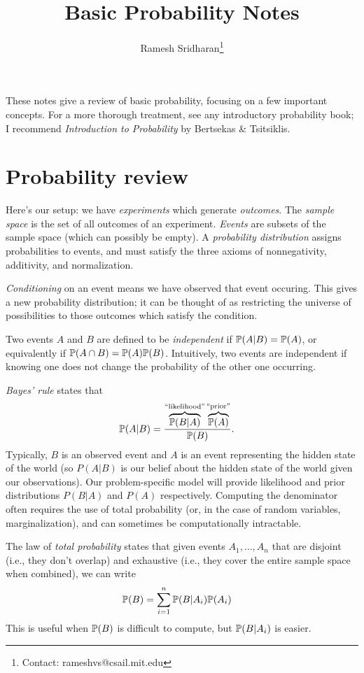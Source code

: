 \documentclass[12pt]{article}
\title{Basic Probability Notes}
\author{Ramesh Sridharan\thanks{Contact: \mbox{rameshvs@csail.mit.edu}}}
\date{}
\begin{document}
    \maketitle
    These notes give a review of basic probability, focusing on a few important
    concepts.  For a more thorough treatment, see any introductory probability
    book; I recommend \emph{Introduction to Probability} by Bertsekas \& Tsitsiklis.
    \section*{Probability review}
    Here's our setup: we have \textsl{experiments} which generate
    \textsl{outcomes}.  The \textsl{sample space} is the set of all outcomes of
    an experiment.  \textsl{Events} are subsets of the sample space (which can
    possibly be empty). A \textsl{probability distribution} assigns
    probabilities to events, and must satisfy the three axioms of
    nonnegativity, additivity, and normalization.

    \textsl{Conditioning} on an event means we have observed that event
    occuring.  This gives a new probability distribution; it can be thought of
    as restricting the universe of possibilities to those outcomes which
    satisfy the condition.

    Two events $A$ and $B$ are defined to be \textsl{independent} if $\P(A|B) =
    \P(A)$, or equivalently if $\P(A \cap B) = \P(A)\P(B)$. Intuitively, two
    events are independent if knowing one does not change the probability of
    the other one occurring.

    \textsl{Bayes' rule} states that
    \begin{align*}
        \P(A|B) &= \frac{\overbrace{\P(B|A)}^{\text{``likelihood''}}\overbrace{\P(A)}^{\text{``prior''}}}{\P(B)}.
    \end{align*}
    Typically, $B$ is an observed event and $A$ is an event representing the
    hidden state of the world (so $P(A|B)$ is our belief about the hidden
    state of the world given our observations). Our problem-specific model will
    provide likelihood and prior distributions $P(B|A)$ and $P(A)$
    respectively. Computing the denominator often requires the use of total
    probability (or, in the case of random variables, marginalization), and can
    sometimes be computationally intractable.

    The law of \textsl{total probability} states that given events $A_1,
    \ldots, A_n$ that are disjoint (i.e., they don't overlap) and exhaustive
    (i.e., they cover the entire sample space when combined), we can write
    \begin{align*}
        \P(B) &= \sum_{i=1}^n \P(B|A_i) \P(A_i)
    \end{align*}
    This is useful when $\P(B)$ is difficult to compute, but $\P(B|A_i)$ is easier.
\end{document}
